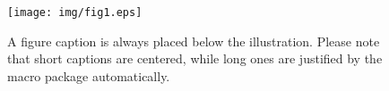 \begin{figure}
  \texttt{[image: img/fig1.eps]}
  \caption{A figure caption is always placed below the illustration.
  Please note that short captions are centered, while long ones are
  justified by the macro package automatically.} \label{fig1}
\end{figure}
